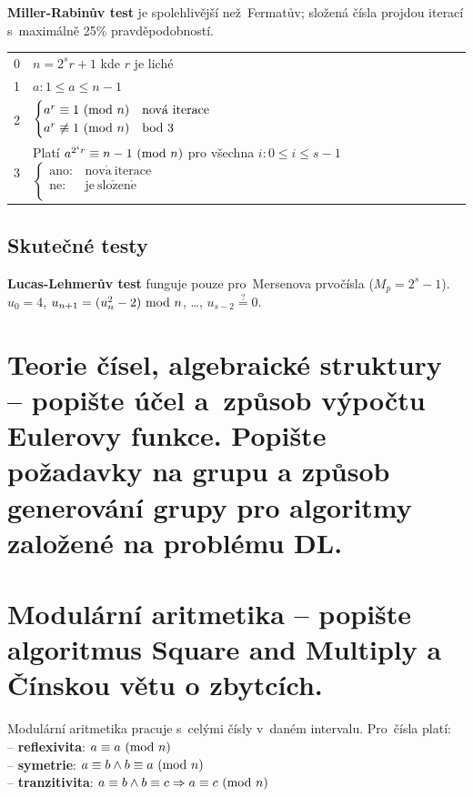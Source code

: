\noindent \textbf{Miller-Rabinův test} je spolehlivější než~Fermatův; složená čísla projdou iterací s~maximálně 25\% pravděpodobností.

\begin{table}[ht]
\begin{tabular}{l|l}
0 & $n = 2^s r + 1$ kde $r$ je liché \\
1 & $a: 1 \leq a \leq n-1$ \\
2 & $\begin{cases}
a^r \equiv 1 \ (\mathrm{mod}\ n) & \mathrm{nov\acute{a}\ iterace} \\
a^r \not\equiv 1 \ (\mathrm{mod}\ n) & \mathrm{bod\ 3} \\
\end{cases}$ \\
3 & Platí $a^{2^i r} \equiv n-1 \ (\mathrm{mod}\ n)$ pro všechna $i: 0 \leq i \leq s-1$ $\begin{cases}
\mathrm{ano:} & \mathrm{nov\acute{a}\ iterace} \\
\mathrm{ne:} & \mathrm{je\ slo\check{z}en\acute{e}} \\
\end{cases}$ \\
\end{tabular}
\end{table}

\subsection{Skutečné testy}

\textbf{Lucas-Lehmerův test} funguje pouze pro~Mersenova prvočísla ($M_p = 2^s - 1$). \\
$u_0 = 4$, $u_{n+1} = (u_n^2 - 2) \ \mathrm{mod}\ n$, \dots, $u_{s-2} \stackrel{?}{=} 0$.

\clearpage
\section{Teorie čísel, algebraické struktury -- popište účel a~způsob výpočtu Eulerovy funkce. Popište požadavky na grupu a způsob generování grupy pro algoritmy založené na problému DL.}

\clearpage
\section{Modulární aritmetika -- popište algoritmus Square and Multiply a Čínskou větu o zbytcích.}

Modulární aritmetika pracuje s~celými čísly v~daném intervalu. Pro~čísla platí: \\
-- \textbf{reflexivita}: $a \equiv a \ (\mathrm{mod}\ n)$ \\
-- \textbf{symetrie}: $a \equiv b \wedge b \equiv a \ (\mathrm{mod}\ n)$ \\
-- \textbf{tranzitivita}: $a \equiv b \wedge b \equiv c \Rightarrow a \equiv c \ (\mathrm{mod}\ n)$

